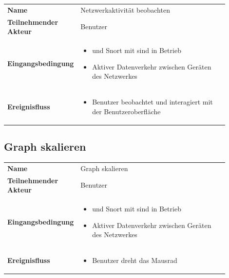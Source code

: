 \begin{tabular}{lp{0.9\linewidth}}
\textbf{Name} & Netzwerkaktivität beobachten \\

\textbf{Teilnehmender Akteur} & Benutzer \\

\textbf{Eingangsbedingung} &
				\begin{minipage}[t]{\linewidth}
				\begin{itemize}[nosep,after=\strut,leftmargin=10pt]

				\item \programname und Snort mit \sppname sind in Betrieb
				\item Aktiver Datenverkehr zwischen Geräten des Netzwerkes

				\end{itemize}
				\end{minipage} \\
\textbf{Ereignisfluss} &
				\begin{minipage}[t]{\linewidth}
				\begin{itemize}[nosep,after=\strut,leftmargin=10pt]

				\item Benutzer beobachtet und interagiert mit der Benutzeroberfläche
				\end{itemize}
				\end{minipage} \\

\end{tabular}

\subsection{Graph skalieren}

\begin{tabular}{lp{0.9\linewidth}}
\textbf{Name} & Graph skalieren \\

\textbf{Teilnehmender Akteur} & Benutzer \\

\textbf{Eingangsbedingung} &
				\begin{minipage}[t]{\linewidth}
				\begin{itemize}[nosep,after=\strut,leftmargin=10pt]

				\item \programname und Snort mit \sppname sind in Betrieb
				\item Aktiver Datenverkehr zwischen Geräten des Netzwerkes

				\end{itemize}
				\end{minipage} \\
\textbf{Ereignisfluss} &
				\begin{minipage}[t]{\linewidth}
				\begin{itemize}[nosep,after=\strut,leftmargin=10pt]
				\item Benutzer dreht das Mausrad
				\end{itemize}
				\end{minipage} \\
\end{tabular}

